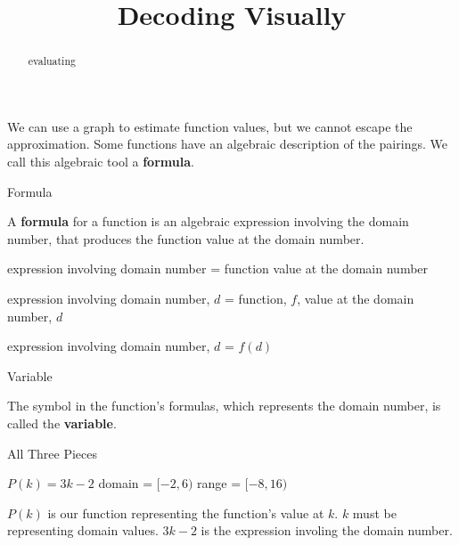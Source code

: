 \documentclass{ximera}
\title{Decoding Visually}
\begin{document}
\begin{abstract}
evaluating
\end{abstract}
\maketitle



We can use a graph to estimate function values, but we cannot escape the approximation.  Some functions have an algebraic description of the pairings.  We call this algebraic tool a \textbf{formula}.



\begin{definition}  Formula


A \textbf{formula} for a function is an algebraic expression involving the domain number, that produces the function value at the domain number.
\end{definition}




\begin{center}
expression involving domain number = function value at the domain number 
\end{center}


\begin{center}
expression involving domain number, $d$ = function, $f$, value at the domain number, $d$
\end{center}


\begin{center}
expression involving domain number, $d$ = $f(d)$
\end{center}




\begin{definition}  Variable


The symbol in the function's formulas, which represents the domain number, is called the \textbf{variable}.
\end{definition}







\begin{example}   All Three Pieces

$P(k) = 3k - 2$
domain = $[-2, 6)$
range = $[-8, 16)$


$P(k)$ is our function representing the function's value at $k$.  $k$ must be representing domain values. $3k - 2$ is the expression involing the domain number.

\end{example}
\end{document}
